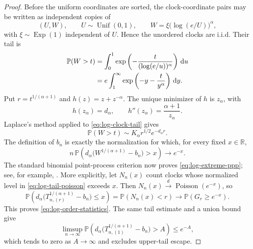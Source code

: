 \documentclass[11pt]{article}
\numberwithin{equation}{section}
\theoremstyle{definition}
\theoremstyle{remark}
\newcommand{\R}{\mathbb R}
\newcommand{\Pp}{\mathbb P}
\newcommand{\Exp}{\operatorname{Exp}}
\newcommand{\dd}{\,\mathrm d}
\begin{document}
\begin{proof}
Before the uniform coordinates are sorted, the clock-coordinate pairs may
be written as independent copies of
\[
  (U,W),\qquad
  U\sim\operatorname{Unif}(0,1),\qquad
  W=\xi\bigl(\log(e/U)\bigr)^\alpha,
\]
with $\xi\sim\Exp(1)$ independent of $U$.  Hence the unordered clocks are
i.i.d.  Their tail is
\begin{align}
  \Pp(W>t)
  &=\int_0^1
    \exp\left(-\frac{t}{(\log(e/u))^\alpha}\right)\dd u\notag\\
  &=e\int_1^\infty\exp\left(-y-\frac{t}{y^\alpha}\right)\dd y.
  \label{eq:log-clock-tail}
\end{align}
Put $r=t^{1/(\alpha+1)}$ and
$h(z)=z+z^{-\alpha}$.  The unique minimizer of $h$ is
$z_\alpha$, with
\[
  h(z_\alpha)=d_\alpha,
  \qquad
  h''(z_\alpha)=\frac{\alpha+1}{z_\alpha}.
\]
Laplace's method applied to \eqref{eq:log-clock-tail} gives
\begin{equation}
  \Pp(W>t)
  \sim K_\alpha r^{1/2}e^{-d_\alpha r}.
  \label{eq:log-tail-asymptotic}
\end{equation}
The definition of $b_n$ is exactly the normalization for which, for every
fixed $x\in\R$,
\begin{equation}
  n\,\Pp\left(
  d_\alpha\bigl(W^{1/(\alpha+1)}-b_n\bigr)>x
  \right)\longrightarrow e^{-x}.
  \label{eq:log-tail-poisson}
\end{equation}
The standard binomial point-process criterion now proves
\eqref{eq:log-extreme-ppp}; see, for example,
\cite[Chapter~5]{Resnick}.  More explicitly, let $N_n(x)$ count clocks
whose normalized level in \eqref{eq:log-tail-poisson} exceeds $x$.
Then $N_n(x)\xrightarrow{d}\operatorname{Poisson}(e^{-x})$, so
\[
 \Pp\left(d_\alpha\bigl(T_{n,(r)}^{1/(\alpha+1)}-b_n\bigr)\leq x\right)
 =\Pp(N_n(x)<r)
 \longrightarrow\Pp(G_r\geq e^{-x}).
\]
This proves \eqref{eq:log-order-statistics}.  The same tail estimate and
a union bound give
\[
 \limsup_{n\to\infty}
 \Pp\left(d_\alpha\bigl(T_{n,(1)}^{1/(\alpha+1)}-b_n\bigr)>A\right)
 \leq e^{-A},
\]
which tends to zero as $A\to\infty$ and excludes upper-tail escape.


\end{proof}
\end{document}

